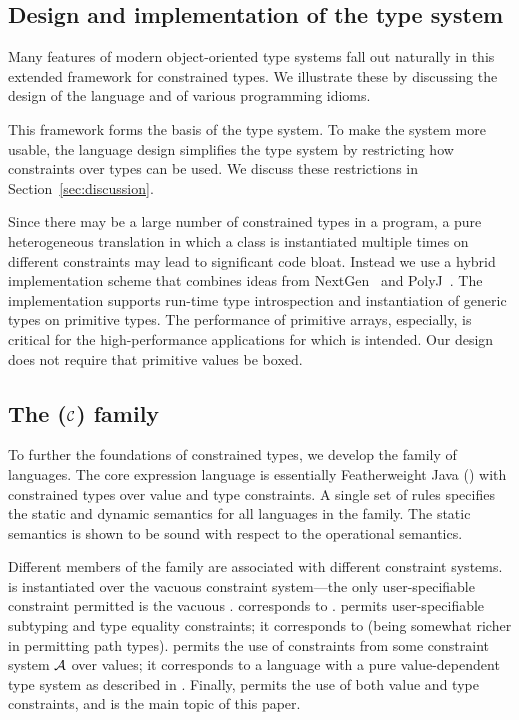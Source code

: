 \subsection{Design and implementation of the \Xten{} type system}

Many features of modern object-oriented type systems fall out
naturally in this extended framework for constrained types.
%
We illustrate these by discussing the design of
the \Xten{} language and of various
programming idioms.

This framework forms the basis of the \Xten type system.
To make the system more usable,
the \Xten language design simplifies the type system by
restricting how constraints over types can be used.
We discuss these restrictions in Section~\ref{sec:discussion}.

Since there may be a large number of constrained types
in a program, a pure heterogeneous translation
in which a class is instantiated multiple times on different
constraints
may lead to significant
code bloat. Instead we use a hybrid implementation scheme that
combines ideas from NextGen~\cite{nextgen,allen03} and
PolyJ~\cite{java-popl97}. The implementation supports run-time type
introspection and instantiation of generic types on primitive types.
The performance of primitive arrays, especially, is critical for the
high-performance applications for which \Xten{} is intended.  Our
design does not require that primitive values be boxed.

\subsection{The \FX{}($\cal C$) family}
To further the foundations of constrained types, we develop the \FX{}
family of languages. The core expression language is essentially
Featherweight Java (\FJ \cite{FJ}) with constrained types over
value and type constraints.
A single set of rules specifies the static and dynamic
semantics for all languages in the family.  The static semantics is
shown to be sound with respect to the operational semantics.

Different members of the family are associated with different
constraint systems. \FXZ{} is
\FX{} instantiated over the vacuous constraint system---the only
user-specifiable constraint permitted is the vacuous . \FXZ{}
corresponds to \FJ. \FXG{} permits user-specifiable subtyping
and type equality constraints; it corresponds to
\FGJ{} (being somewhat richer in permitting path types). \FXD{} permits
the use of constraints from some constraint system $\cal A$ over
values; it
corresponds to a language with a pure value-dependent type system as
described in \cite{constrained-types}. Finally, \FXGD{} permits the
use of both value and type constraints,
and is the main topic of this paper.


